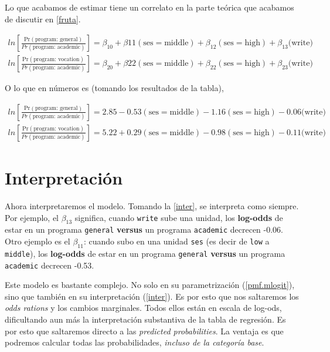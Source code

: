 \documentclass[onesided]{article}\usepackage[]{graphicx}\usepackage[]{color}
\begin{document}
Lo que acabamos de estimar tiene un correlato en la parte te\'orica que acabamos de discutir en \autoref{fruta}.


\begin{equation}
\begin{split}
ln[\frac{\text{Pr}(\text{program: general})}{Pr(\text{program: academic})}]  = \beta_{10} + \beta{11}(\text{ses}=\text{middle}) + \beta_{12}(\text{ses}=\text{high}) + \beta_{13}\text{(write)}\\
ln[\frac{\text{Pr}(\text{program: vocation})}{Pr(\text{program: academic})}] = \beta_{20} + \beta{22}(\text{ses}=\text{middle}) + \beta_{22}(\text{ses}=\text{high}) + \beta_{23}\text{(write)}
\end{split}
\end{equation}

O lo que en n\'umeros es (tomando los resultados de la tabla),

\begin{equation}\label{inter}
\begin{split}
ln[\frac{\text{Pr}(\text{program: general})}{Pr(\text{program: academic})}]  = 2.85 -0.53(\text{ses}=\text{middle})  -1.16(\text{ses}=\text{high}) -0.06\text{(write)}\\
ln[\frac{\text{Pr}(\text{program: vocation})}{Pr(\text{program: academic})}] = 5.22 + 0.29(\text{ses}=\text{middle}) -0.98(\text{ses}=\text{high}) -0.11\text{(write)}
\end{split}
\end{equation}


 



\section{Interpretaci\'on} 

Ahora interpretaremos el modelo. Tomando la \autoref{inter}, se interpreta como siempre. Por ejemplo, el $\beta_{13}$ significa, cuando \texttt{write} sube una unidad, los {\bf log-odds} de estar en un programa \texttt{general} {\bf versus} un programa \texttt{academic} decrecen -0.06. Otro ejemplo es el $\beta_{11}$: cuando subo en una unidad \texttt{ses} (es decir de \texttt{low} a \texttt{middle}), los {\bf log-odds} de estar en un programa \texttt{general} {\bf versus} un programa \texttt{academic} decrecen -0.53.

Este modelo es bastante complejo. No solo en su parametrizaci\'on (\autoref{pmf.mlogit}), sino que tambi\'en en su interpretaci\'on (\autoref{inter}). Es por esto que nos saltaremos los \emph{odds rations} y los cambios marginales. Todos ellos est\'an en escala de log-ods, dificultando aun m\'as la interpretaci\'on substantiva de la tabla de regresi\'on. Es por esto que saltaremos directo a las \emph{predicted probabilities}. La ventaja es que podremos calcular todas las probabilidades, \emph{incluso de la categor\'ia base}. 
\end{document}
